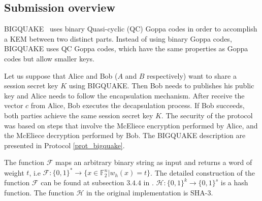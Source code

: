 \label{sec:attack}
\subsection{Submission overview}
BIGQUAKE~\cite{bardet2017big} uses binary Quasi-cyclic (QC) Goppa codes in order to accomplish a KEM between two distinct parts. Instead of using binary Goppa codes, BIGQUAKE uses QC Goppa codes, which have the same properties as Goppa codes but allow smaller keys.

Let us suppose that Alice and Bob ($A$ and $B$ respectively) want to share a session secret key $K$ using BIGQUAKE. Then Bob needs to publishes his public key and Alice needs to follow the encapsulation mechanism. After receive the vector $c$ from Alice, Bob executes the decapsulation process. If Bob succeeds, both parties achieve the same session secret key $K$. The security of the protocol was based on steps that involve the McEliece encryption performed by Alice, and the McEliece decryption performed by Bob. The BIGQUAKE description are presented in Protocol \ref{prot_bigquake}.

The function $\mathcal{F}$ maps an arbitrary binary string as input and returns a word of weight $t$, i.e $\mathcal{F}: \{0,1\}^* \to \{x \in \mathbb{F}^n_2 | w_h(x) = t\}$. The detailed construction of the function $\mathcal{F}$ can be found at subsection $3.4.4$ in \cite{bardet2017big}. $\mathcal{H} : \{0,1\}^k \to \{0,1\}^s$ is a hash function. The function $\mathcal{H}$ in the original implementation is SHA-3. 


